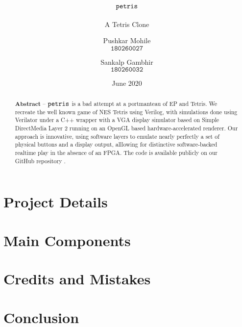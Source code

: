 \documentclass[10pt, a4paper, egregdoesnotlikesansseriftitles]{scrartcl}
\title{$\texttt{petris}$}
\subtitle{A Tetris Clone}
\author{
    Pushkar Mohile \\
    $\texttt{180260027}$
    \and
    Sankalp Gambhir \\
    $\texttt{180260032}$
    }
\date{June 2020}
\begin{document}
\maketitle

\begin{abstract}
    \centering
    $\textbf{Abstract --}$
    $\texttt{petris}$ is a bad attempt at a portmanteau of 
    EP and Tetris. We recreate the well known game of NES Tetris \cite{tetris}
    using Verilog, with simulations done using Verilator \cite{verilator} under
    a C++ wrapper with a VGA display simulator based on Simple DirectMedia Layer 2
    \cite{sdl2} running on an OpenGL based hardware-accelerated renderer. Our approach
    is innovative, using software layers to emulate nearly perfectly a set of
    physical buttons and a display output, alllowing for distinctive software-backed
    realtime play in the absence of an FPGA. The code is available publicly on our 
    GitHub repository \cite{petrisgit}.

\end{abstract}

  
\section{Project Details}


\section{Main Components}



\section{Credits and Mistakes}


\pagebreak

\section{Conclusion}




\end{document}
